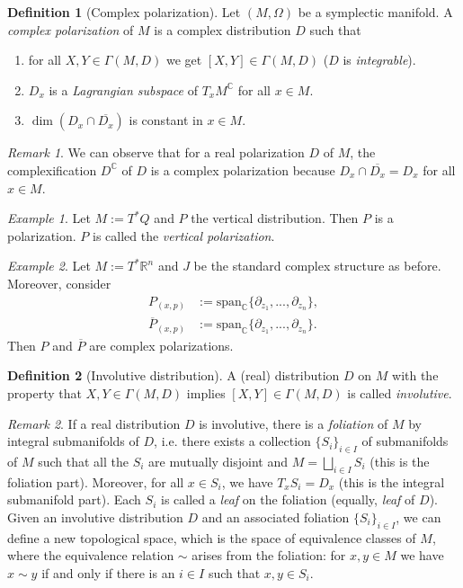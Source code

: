 \documentclass[12pt]{amsart}
\numberwithin{equation}{section}
\theoremstyle{plain}
\theoremstyle{definition}
\newtheorem{defn}{Definition}[subsection]
\theoremstyle{remark}
\newtheorem{rem}{Remark}[subsection]
\newtheorem{ex}{Example}[subsection]
\newcommand{\R}{\mathbb{R}}
\begin{document}
\begin{defn}[Complex polarization]
Let $(M,\Omega)$ be a symplectic manifold. A \emph{complex polarization} of $M$ is a complex distribution $D$ such that 
\begin{enumerate}
\item{for all $X,Y\in\Gamma(M,D)$ we get $[X,Y]\in\Gamma(M,D)$ ($D$ is \emph{integrable}).
}
\item{$D_x$ is a \emph{Lagrangian subspace} of $T_xM^\mathbb{C}$ for all $x\in M$.}
\item{$\dim(D_x\cap\overline{D_x})$ is constant in $x\in M$.}
\end{enumerate}
\end{defn}

\begin{rem}
We can observe that for a real polarization $D$ of $M$, the complexification $D^\mathbb{C}$ of $D$ is a complex polarization because $D_x\cap\overline{D_x}=D_x$ for all $x\in M$.
\end{rem}


\begin{ex}
Let $M:=T^*Q$ and $P$ the vertical distribution. Then $P$ is a polarization. $P$ is called the \emph{vertical polarization}.
\end{ex}

\begin{ex}
Let $M:=T^*\R^{n}$ and $J$ be the standard complex structure as before. Moreover, consider
\begin{align*}
   P_{(x,p)}&:=\mathrm{span}_\mathbb{C}\{\partial_{z_1},...,\partial_{z_n}\},\\
   \overline{P}_{(x,p)}&:=\mathrm{span}_\mathbb{C}\{\partial_{z_1},...,\partial_{z_n}\}.
\end{align*}
Then $P$ and $\overline{P}$ are complex polarizations.
\end{ex}

\begin{defn}[Involutive distribution]
A (real) distribution $D$ on $M$ with the property that $X,Y\in \Gamma(M,D)$ implies $[X,Y]\in\Gamma(M,D)$ is called \emph{involutive}.
\end{defn}

\begin{rem}
If a real distribution $D$ is involutive, there is a \emph{foliation} of $M$ by integral submanifolds of $D$, i.e. there exists a collection $\{S_i\}_{i\in I}$ of submanifolds of $M$ such that all the $S_i$ are mutually disjoint and $M=\bigsqcup_{i\in I}S_i$ (this is the foliation part). Moreover, for all $x\in S_i$, we have $T_xS_i=D_x$ (this is the integral submanifold part). Each $S_i$ is called a \emph{leaf} on the foliation (equally, \emph{leaf} of $D$). Given an involutive distribution $D$ and an associated foliation $\{S_i\}_{i\in I}$, we can define a new topological space, which is the space of equivalence classes of $M$, where the equivalence relation $\sim$ arises from the foliation: for $x,y\in M$ we have $x\sim y$ if and only if there is an $i\in I$ such that $x,y\in S_i$.
\end{rem}
\end{document}
